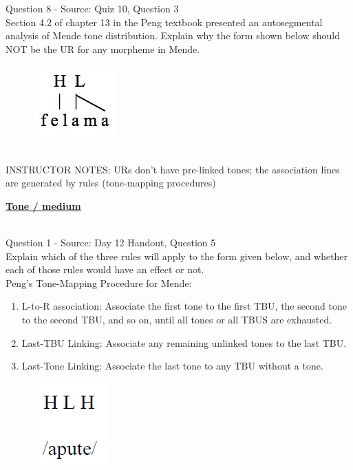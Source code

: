 \documentclass[12pt]{article}
\begin{document}
{\large Question 8} - Source: Quiz 10, Question 3\\

Section 4.2 of chapter 13 in the Peng textbook presented an autosegmental analysis of Mende tone distribution. Explain why the form shown below should NOT be the UR for any morpheme in Mende.\\

\begin{figure}[H]
\includegraphics{../images/mende_junction_d.png}
\end{figure}

~\\
INSTRUCTOR NOTES: URs don't have pre-linked tones; the association lines are generated by rules (tone-mapping procedures)


\newpage\textbf{\underline{\huge Tone / medium\\}}

~\\

{\large Question 1} - Source: Day 12 Handout, Question 5\\

Explain which of the three rules will apply to the form given below, and whether each of those rules would have an effect or not.\\

Peng’s Tone-Mapping Procedure for Mende: \begin{enumerate} \item L-to-R association: Associate the first tone to the first TBU, the second tone to the second TBU, and so on, until all tones or all TBUS are exhausted. \item Last-TBU Linking: Associate any remaining unlinked tones to the last TBU. \item Last-Tone Linking: Associate the last tone to any TBU without a tone. \end{enumerate}

\begin{figure}[H]
\includegraphics{../images/mendetone_a.png}
\end{figure}
\end{document}

